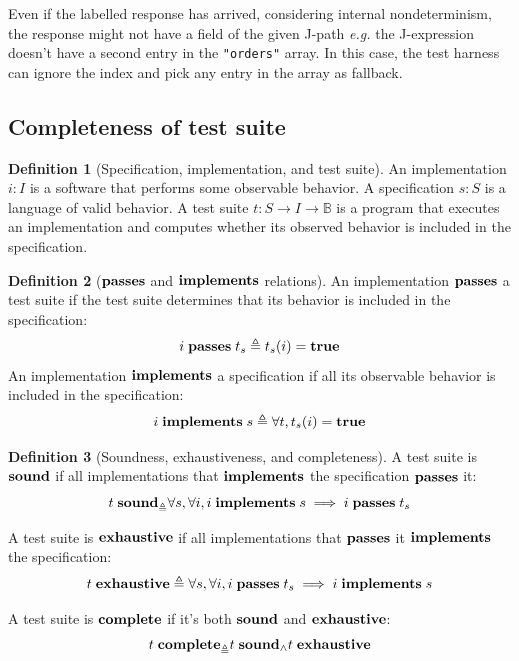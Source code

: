 \documentclass{article}
\newcommand{\ilj}[1]{\lstinline[style=json]{#1}}
\theoremstyle{definition}
\newtheorem{definition}{Definition}
\newcommand{\sound}{\ottkw{sound}}
\newcommand{\issound}[2]{#1\;\sound_{#2}}
\newcommand{\complete}{\ottkw{complete}}
\newcommand{\iscomplete}[2]{#1\;\complete_{#2}}
\newcommand{\bool}{\mathbb B}
\newcommand{\true}{\ottkw{true}}
\newcommand{\imp}{\ottkw{implements}}
\newcommand{\pass}{\ottkw{passes}}
\newcommand{\exhaust}{\ottkw{exhaustive}}
\newcommand{\defeq}{\triangleq}
\newcommand{\implements}[2]{#1\;\imp\;#2}
\newcommand{\passes}[2]{#1\;\pass\;#2}
\newcommand{\isexhaust}[1]{#1\;\exhaust}
\begin{document}
Even if the labelled response has arrived, considering internal nondeterminism,
the response might not have a field of the given J-path {\it e.g.}  the
J-expression doesn't have a second entry in the \ilj{"orders"} array.  In this
case, the test harness can ignore the index and pick any entry in the array as
fallback.
\subsection{Completeness of test suite}

\begin{definition}[Specification, implementation, and test suite]
  An implementation $i:I$ is a software that performs some observable behavior.
  A specification $s:S$ is a language of valid behavior.  A test suite $t:S\to
  I\to\bool$ is a program that executes an implementation and computes whether
  its observed behavior is included in the specification.
\end{definition}

\begin{definition}[$\pass$ and $\imp$ relations]
  An implementation $\pass$ a test suite if the test suite determines that its
  behavior is included in the specification:
  \[ \passes{i}{t_s}\defeq t_s(i)=\true \]
  An implementation $\imp$ a specification if all its observable behavior is
  included in the specification:
  \[ \implements{i}{s}\defeq\forall t,t_s(i)=\true \]
\end{definition}
\begin{definition}[Soundness, exhaustiveness, and completeness]
  A test suite is $\sound$ if all implementations that $\imp$ the specification
  $\pass$ it:
  \[ \issound{t}\defeq\forall s,\forall i,
  \implements{i}{s}\implies\passes{i}{t_s} \]

  A test suite is $\exhaust$ if all implementations that $\pass$ it $\imp$ the
  specification:
  \[ \isexhaust{t}\defeq\forall s,\forall i,
  \passes{i}{t_s}\implies\implements{i}{s} \]

  A test suite is $\complete$ if it's both $\sound$ and $\exhaust$:
  \[ \iscomplete{t}\defeq\issound{t}\wedge\isexhaust{t} \]
\end{definition}
\end{document}
